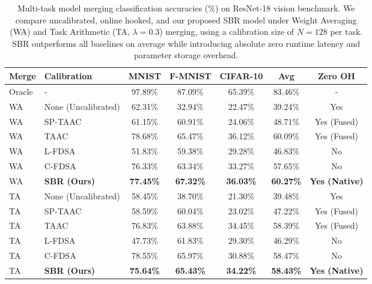\documentclass{article}
\theoremstyle{plain}
\theoremstyle{definition}
\theoremstyle{remark}
\begin{document}
\begin{table}[t]
\caption{Multi-task model merging classification accuracies (\%) on ResNet-18 vision benchmark. We compare uncalibrated, online hooked, and our proposed SBR model under Weight Averaging (WA) and Task Arithmetic (TA, $\lambda = 0.3$) merging, using a calibration size of $N = 128$ per task. SBR outperforms all baselines on average while introducing absolute zero runtime latency and parameter storage overhead.}
\label{tab:results}
\vskip 0.15in
\begin{center}
\begin{small}
\begin{sc}
\setlength{\tabcolsep}{3pt}
\begin{tabular}{llccccc}
\toprule
Merge & Calibration & MNIST & F-MNIST & CIFAR-10 & Avg & Zero OH \\
\midrule
Oracle & - & 97.89\% & 87.09\% & 65.39\% & 83.46\% & - \\
\midrule
WA & None (Uncalibrated) & 62.31\% & 32.94\% & 22.47\% & 39.24\% & Yes \\
WA & SP-TAAC~\cite{sptaac2026} & 61.15\% & 60.91\% & 24.06\% & 48.71\% & Yes (Fused) \\
WA & TAAC~\cite{taac2026} & 78.68\% & 65.47\% & 36.12\% & 60.09\% & Yes (Fused) \\
WA & L-FDSA~\cite{fdsa2026} & 51.83\% & 59.38\% & 29.28\% & 46.83\% & No \\
WA & C-FDSA~\cite{fdsa2026} & 76.33\% & 63.34\% & 33.27\% & 57.65\% & No \\
WA & \textbf{SBR (Ours)} & \textbf{77.45\%} & \textbf{67.32\%} & \textbf{36.03\%} & \textbf{60.27\%} & \textbf{Yes (Native)} \\
\midrule
TA & None (Uncalibrated) & 58.45\% & 38.70\% & 21.30\% & 39.48\% & Yes \\
TA & SP-TAAC~\cite{sptaac2026} & 58.59\% & 60.04\% & 23.02\% & 47.22\% & Yes (Fused) \\
TA & TAAC~\cite{taac2026} & 76.83\% & 63.88\% & 34.45\% & 58.39\% & Yes (Fused) \\
TA & L-FDSA~\cite{fdsa2026} & 47.73\% & 61.83\% & 29.30\% & 46.29\% & No \\
TA & C-FDSA~\cite{fdsa2026} & 78.55\% & 65.97\% & 30.88\% & 58.47\% & No \\
TA & \textbf{SBR (Ours)} & \textbf{75.64\%} & \textbf{65.43\%} & \textbf{34.22\%} & \textbf{58.43\%} & \textbf{Yes (Native)} \\
\bottomrule
\end{tabular}
\end{sc}
\end{small}
\end{center}
\vskip -0.1in
\end{table}
\end{document}
